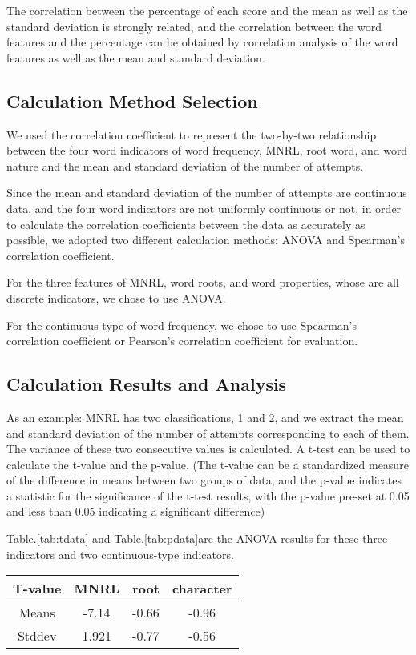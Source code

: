 \documentclass[12pt]{article}  %
\begin{document}
The correlation between the percentage of each score and the mean as well as the standard deviation is strongly related, and the correlation between the word features and the percentage can be obtained by correlation analysis of the word features as well as the mean and standard deviation.

\subsection{Calculation Method Selection}

We used the correlation coefficient to represent the two-by-two relationship between the four word indicators of word frequency, MNRL, root word, and word nature and the mean and standard deviation of the number of attempts.

Since the mean and standard deviation of the number of attempts are continuous data, and the four word indicators are not uniformly continuous or not, in order to calculate the correlation coefficients between the data as accurately as possible, we adopted two different calculation methods: ANOVA and Spearman's correlation coefficient.

For the three features of MNRL, word roots, and word properties, whose are all discrete indicators, we chose to use ANOVA.

For the continuous type of word frequency, we chose to use Spearman's correlation coefficient or Pearson's correlation coefficient for evaluation.


\subsection{Calculation Results and Analysis}

As an example: MNRL has two classifications, 1 and 2, and we extract the mean and standard deviation of the number of attempts corresponding to each of them. The variance of these two consecutive values is calculated. A t-test can be used to calculate the t-value and the p-value. (The t-value can be a standardized measure of the difference in means between two groups of data, and the p-value indicates a statistic for the significance of the t-test results, with the p-value pre-set at 0.05 and less than 0.05 indicating a significant difference)

Table.\ref{tab:tdata} and Table.\ref{tab:pdata}are the ANOVA results for these three indicators and two continuous-type indicators.

\begin{table*}
	\centering
	\begin{tabular}{  |c|c|c|c|
		}
		
		\hline
		T-value 	& MNRL	& root	 & character \\ 
		\hline
		Means	& -7.14		& -0.66		 & -0.96  \\ 
		\hline 
		Stddev & 1.921 		& -0.77		 & -0.56  \\ 
		\hline 
		
	\end{tabular}
	\caption{T-value data}
	\label{tab:tdata}
\end{table*}
\end{document}
